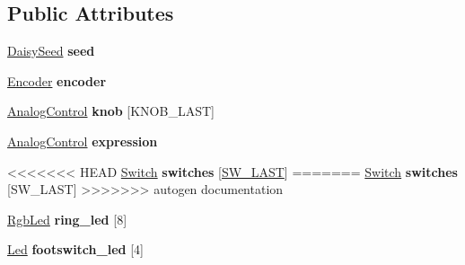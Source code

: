 \begin{DoxyCompactItemize}
\subsection*{Public Attributes}
\begin{DoxyCompactItemize}
\item 
\mbox{\label{classdaisy_1_1_daisy_petal_a2ef75f14bf008985bf6635e9ce87106a}} 
\hyperlink{classdaisy_1_1_daisy_seed}{Daisy\+Seed} {\bfseries seed}
\item 
\mbox{\label{classdaisy_1_1_daisy_petal_aa15f086c0ca0d05cd93a8aa4ae45054a}} 
\hyperlink{classdaisy_1_1_encoder}{Encoder} {\bfseries encoder}
\item 
\mbox{\label{classdaisy_1_1_daisy_petal_a2b7a221b0c519a002351d883b6e033bb}} 
\hyperlink{classdaisy_1_1_analog_control}{Analog\+Control} {\bfseries knob} \mbox{[}K\+N\+O\+B\+\_\+\+L\+A\+ST\mbox{]}
\item 
\mbox{\label{classdaisy_1_1_daisy_petal_a3da99ba1f0b9f20dff99d8d2f4cf0cca}} 
\hyperlink{classdaisy_1_1_analog_control}{Analog\+Control} {\bfseries expression}
\item 
\mbox{\label{classdaisy_1_1_daisy_petal_a4c23c5086d0620b98c2d4a86fde53af2}} 
<<<<<<< HEAD
\hyperlink{classdaisy_1_1_switch}{Switch} {\bfseries switches} \mbox{[}\hyperlink{classdaisy_1_1_daisy_petal_a2651bb58e6ae33c0bd4bc770df3c7911af4668f61ed58c3103b2800d3cf45ca7c}{S\+W\+\_\+\+L\+A\+ST}\mbox{]}
=======
\hyperlink{classdaisy_1_1_switch}{Switch} {\bfseries switches} \mbox{[}S\+W\+\_\+\+L\+A\+ST\mbox{]}
>>>>>>> autogen documentation
\item 
\mbox{\label{classdaisy_1_1_daisy_petal_a24abaac2327c0057f99b5d5a4f15bd5a}} 
\hyperlink{classdaisy_1_1_rgb_led}{Rgb\+Led} {\bfseries ring\+\_\+led} \mbox{[}8\mbox{]}
\item 
\mbox{\label{classdaisy_1_1_daisy_petal_a0adb82d937f3b214214aa2370b12f75e}} 
\hyperlink{classdaisy_1_1_led}{Led} {\bfseries footswitch\+\_\+led} \mbox{[}4\mbox{]}
\end{DoxyCompactItemize}



\end{DoxyCompactItemize}

